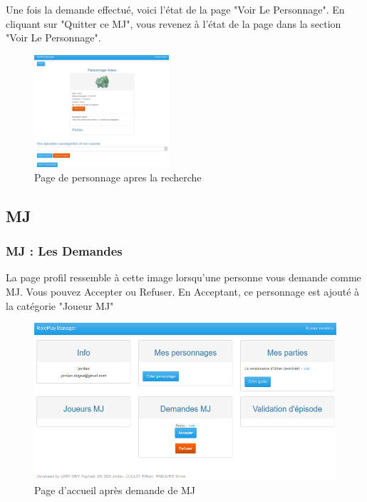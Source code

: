 \documentclass[a4paper,oneside,10pt]{article}
\begin{document}
Une fois la demande effectué, voici l'état de la page "Voir Le Personnage". En cliquant sur "Quitter ce MJ", vous revenez à l'état de la page dans la section "Voir Le Personnage". 

\begin{figure}[H]
	\begin{center}
		\includegraphics[width=5cm]{images/manuel/voirpersonnagedemandeMJ.png}  
		\caption{Page de personnage apres la recherche}
	\end{center}
\end{figure}


\subsection{MJ}

\subsubsection{MJ : Les Demandes}
\label{MUMJLesDemandes}

La page profil ressemble à cette image lorsqu'une personne vous demande comme MJ. Vous pouvez Accepter ou Refuser. En Acceptant, ce personnage est ajouté à la catégorie "Joueur MJ"
\begin{figure}[H]
	\begin{center}
		\includegraphics[width=\textwidth]{images/manuel/profildemande.png}  
		\caption{Page d'accueil après demande de MJ}
	\end{center}
\end{figure}
\end{document}
